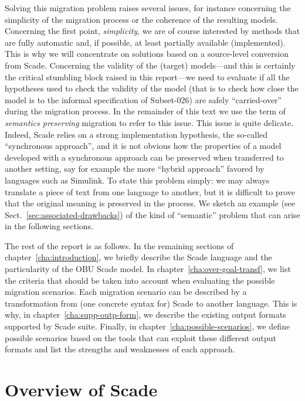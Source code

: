 \documentclass{template/openetcs_report}
\begin{document}
Solving this migration problem raises several issues, for instance
concerning the simplicity of the migration process or the coherence of
the resulting models. Concerning the first point, \emph{simplicity},
we are of course interested by methods that are fully automatic and,
if possible, at least partially available (implemented). This is why
we will concentrate on solutions based on a source-level conversion
from Scade. Concerning the validity of the (target) models---and this
is certainly the critical stumbling block raised in this report---we
need to evaluate if all the hypotheses used to check the validity of
the model (that is to check how close the model is to the informal
specification of Subset-026) are safely ``carried-over'' during the
migration process. In the remainder of this text we use the term of
\emph{semantics preserving} migration to refer to this issue. This
issue is quite delicate. Indeed, Scade relies on a strong
implementation hypothesis, the so-called ``synchronous approach'', and
it is not obvious how the properties of a model developed with a
synchronous approach can be preserved when transferred to another
setting, say for example the more ``hybrid approach'' favored by
languages such as Simulink. To state this problem simply: we may
always translate a piece of text from one language to another, but it
is difficult to prove that the original meaning is preserved in the
process. We sketch an example (see
Sect.~\ref{sec:associated-drawbacks}) of the kind of ``semantic''
problem that can arise in the following sections.

The rest of the report is as follows. In the remaining sections of
chapter~\ref{cha:introduction}, we briefly describe the Scade language
and the particularity of the OBU Scade model. In
chapter~\ref{cha:over-goal-transf}, we list the criteria that should
be taken into account when evaluating the possible migration
scenarios. Each migration scenario can be described by a
transformation from (one concrete syntax for) Scade to another
language. This is why, in chapter~\ref{cha:supp-outp-form}, we
describe the existing output formats supported by Scade
suite. Finally, in chapter~\ref{cha:possible-scenarios}, we define
possible scenarios based on the tools that can exploit these different
output formats and list the strengths and weaknesses of each approach.


\section{Overview of Scade}
\end{document}
